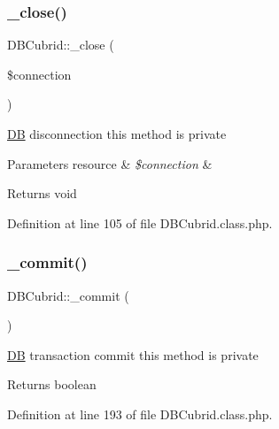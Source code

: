 \mbox{\label{classDBCubrid_ab1a7b718fc864d7b5992cd99abfe2690}} 
\subsubsection{\texorpdfstring{\+\_\+close()}{\_close()}}
{\footnotesize\ttfamily D\+B\+Cubrid\+::\+\_\+close (\begin{DoxyParamCaption}\item[{}]{\$connection }\end{DoxyParamCaption})}

\hyperlink{classDB}{DB} disconnection this method is private 
\begin{DoxyParams}[1]{Parameters}
resource & {\em \$connection} & \\
\hline
\end{DoxyParams}
\begin{DoxyReturn}{Returns}
void 
\end{DoxyReturn}


Definition at line 105 of file D\+B\+Cubrid.\+class.\+php.

\mbox{\label{classDBCubrid_ac8cce69fb6939b2383eb03214ff2522b}} 
\subsubsection{\texorpdfstring{\+\_\+commit()}{\_commit()}}
{\footnotesize\ttfamily D\+B\+Cubrid\+::\+\_\+commit (\begin{DoxyParamCaption}{ }\end{DoxyParamCaption})}

\hyperlink{classDB}{DB} transaction commit this method is private \begin{DoxyReturn}{Returns}
boolean 
\end{DoxyReturn}


Definition at line 193 of file D\+B\+Cubrid.\+class.\+php.

\mbox{\label{classDBCubrid_abe5eb360cf9f08ecb9114d082dd24660}} 
